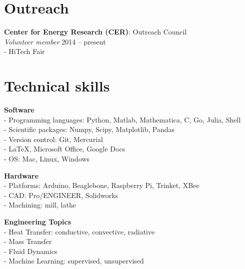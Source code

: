 \documentclass[line]{res}
\begin{document}
\begin{resume}
\section{Outreach}
%

\textbf{Center for Energy Research (CER)}: Outreach Council \\
\textit{Volunteer member} \hfill 2014 -- present \\
- HiTech Fair


\section{Technical skills}
\vspace{0.1in}

\textbf{Software} \\
- Programming languages: Python, Matlab, Mathematica, C, Go, Julia, Shell \\
- Scientific packages: Numpy, Scipy, Matplotlib, Pandas \\
- Version control: Git, Mercurial \\
- LaTeX, Microsoft Office, Google Docs \\
- OS: Mac, Linux, Windows \\

\vspace{-0.2in}

\textbf{Hardware} \\
- Platforms: Arduino, Beaglebone, Raspberry Pi, Trinket, XBee \\
- CAD: Pro/ENGINEER, Solidworks \\
- Machining: mill, lathe \\

\vspace{-0.2in}

\textbf{Engineering Topics} \\
- Heat Transfer: conductive, convective, radiative \\
- Mass Transfer \\
- Fluid Dynamics \\
- Machine Learning: supervised, unsupervised \\


\end{resume}
\end{document}
